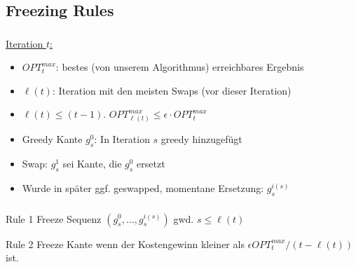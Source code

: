 \subsection{Freezing Rules}


\begin{frame}
    \frametitle{\insertsubsection}
    \underline{Iteration $t$:}
    \vspace{.8em}
    \begin{itemize}
        \itemsep\setlength{1em}
        \item $OPT_t^{max}$: bestes (von unserem Algorithmus) erreichbares Ergebnis
        \item $\ell(t)$: Iteration mit den meisten Swaps (vor dieser Iteration)
        \item $\ell(t) \leq (t-1)$. $OPT_{\ell(t)}^{max} \leq \epsilon \cdot OPT_t^{max}$
        \item Greedy Kante $g_s^0$: In Iteration $s$ greedy hinzugefügt
        \item Swap: $g_s^1$ sei Kante, die $g_s^0$ ersetzt
        \item Wurde in später ggf. geswapped, momentane Ersetzung: $g_s^{i(s)}$
    \end{itemize}
\end{frame}

\begin{frame}
    \frametitle{\insertsubsection}
    \begin{block}{Rule 1}
        \vspace{.6em}
        Freeze Sequenz $(g_s^0, ..., g_s^{i(s)})$ gwd. $s \leq \ell(t)$
        \vspace{.6em}
    \end{block}
    \vspace{1em}
    \begin{block}{Rule 2}
        \vspace{.6em}
        Freeze Kante wenn der Kostengewinn kleiner als $\epsilon OPT_t^{max}/ (t-\ell(t))$ ist.
        \vspace{.6em}
    \end{block}
\end{frame}

